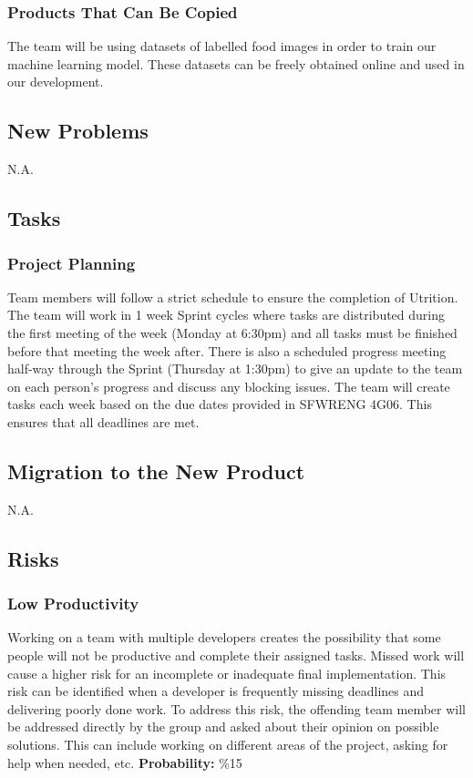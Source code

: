 \documentclass[12pt]{article}
\begin{document}
\subsubsection{Products That Can Be Copied}
The team will be using datasets of labelled food images in order to train our machine learning model. These datasets can be freely obtained online and used in our development.

\subsection{New Problems}
N.A.

\subsection{Tasks}
\subsubsection{Project Planning}
Team members will follow a strict schedule to ensure the completion of Utrition. The team will work in 1 week Sprint cycles where tasks are distributed during the first meeting of the week (Monday at 6:30pm) and all tasks must be finished before that meeting the week after. There is also a scheduled progress meeting half-way through the Sprint (Thursday at 1:30pm) to give an update to the team on each person's progress and discuss any blocking issues. The team will create tasks each week based on the due dates provided in SFWRENG 4G06. This ensures that all deadlines are met.

\subsection{Migration to the New Product}
N.A.

\subsection{Risks}
\subsubsection{Low Productivity}
Working on a team with multiple developers creates the possibility that some people will not be productive and complete their assigned tasks. Missed work will cause a higher risk for an incomplete or inadequate final implementation. This risk can be identified when a developer is frequently missing deadlines and delivering poorly done work. To address this risk, the offending team member will be addressed directly by the group and asked about their opinion on possible solutions. This can include working on different areas of the project, asking for help when needed, etc.\newline
\textbf{Probability:} \%15
\end{document}

